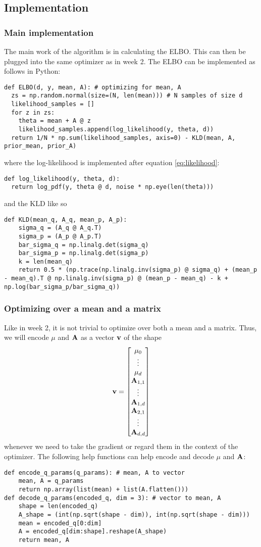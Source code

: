 \subsection{Implementation}
\subsubsection{Main implementation}
The main work of the algorithm is in calculating the ELBO. This can then be plugged into the same optimizer as in week 2.
The ELBO can be implemented as follows in Python:
\begin{verbatim}
def ELBO(d, y, mean, A): # optimizing for mean, A
  zs = np.random.normal(size=(N, len(mean))) # N samples of size d
  likelihood_samples = []
  for z in zs:
    theta = mean + A @ z
    likelihood_samples.append(log_likelihood(y, theta, d))
  return 1/N * np.sum(likelihood_samples, axis=0) - KLD(mean, A, prior_mean, prior_A)
\end{verbatim}
where the log-likelihood is implemented after equation \ref{eq:likelihood}:
\begin{verbatim}
def log_likelihood(y, theta, d):
  return log_pdf(y, theta @ d, noise * np.eye(len(theta)))
\end{verbatim}
and the KLD like so
\begin{verbatim}
def KLD(mean_q, A_q, mean_p, A_p):
    sigma_q = (A_q @ A_q.T)
    sigma_p = (A_p @ A_p.T)
    bar_sigma_q = np.linalg.det(sigma_q)
    bar_sigma_p = np.linalg.det(sigma_p)
    k = len(mean_q)
    return 0.5 * (np.trace(np.linalg.inv(sigma_p) @ sigma_q) + (mean_p - mean_q).T @ np.linalg.inv(sigma_p) @ (mean_p - mean_q) - k + np.log(bar_sigma_p/bar_sigma_q))
\end{verbatim}
\subsubsection{Optimizing over a mean and a matrix}
Like in week 2, it is not trivial to optimize over both a mean and a matrix. Thus, we will encode $\mu$ and $\mathbf{A}$ as a vector $\mathbf{v}$ of the shape
$$\mathbf{v}=\begin{bmatrix}\mu_0 \\ \vdots \\ \mu_d \\ \mathbf{A}_{1,1} \\ \vdots \\ \mathbf{A}_{1,d} \\ \mathbf{A}_{2,1} \\ \vdots \\ \mathbf{A}_{d, d}\end{bmatrix}$$
whenever we need to take the gradient or regard them in the context of the optimizer.
The following help functions can help encode and decode $\mu$ and $\mathbf{A}$:
\begin{verbatim}
def encode_q_params(q_params): # mean, A to vector
    mean, A = q_params
    return np.array(list(mean) + list(A.flatten()))
def decode_q_params(encoded_q, dim = 3): # vector to mean, A
    shape = len(encoded_q)
    A_shape = (int(np.sqrt(shape - dim)), int(np.sqrt(shape - dim)))
    mean = encoded_q[0:dim]
    A = encoded_q[dim:shape].reshape(A_shape)
    return mean, A
\end{verbatim}
